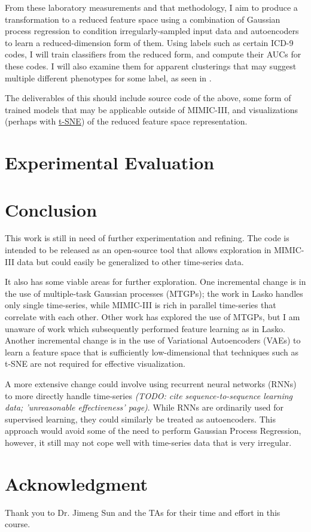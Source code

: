 \documentclass[journal]{IEEEtran}
\begin{document}
From these laboratory measurements and that methodology, I aim to
produce a transformation to a reduced feature space using a
combination of Gaussian process regression to condition
irregularly-sampled input data and autoencoders to learn a
reduced-dimension form of them.  Using labels such as certain ICD-9
codes, I will train classifiers from the reduced form, and compute
their AUCs for these codes.  I will also examine them for apparent
clusterings that may suggest multiple different phenotypes for some
label, as seen in \cite[figure 5]{Lasko2013}.

The deliverables of this should include source code of the above, some
form of trained models that may be applicable outside of MIMIC-III,
and visualizations (perhaps with
\href{https://lvdmaaten.github.io/tsne/}{t-SNE}) of the reduced
feature space representation.

\section{Experimental Evaluation}


\section{Conclusion}

This work is still in need of further experimentation and refining.
The code is intended to be released as an open-source tool that allows
exploration in MIMIC-III data but could easily be generalized to other
time-series data.

It also has some viable areas for further exploration.  One
incremental change is in the use of multiple-task Gaussian processes
(MTGPs); the work in Lasko handles only single time-series, while
MIMIC-III is rich in parallel time-series that correlate with each
other.  Other work has explored the use of MTGPs, but I am unaware of
work which subsequently performed feature learning as in Lasko.
Another incremental change is in the use of Variational Autoencoders
(VAEs) to learn a feature space that is sufficiently low-dimensional
that techniques such as t-SNE are not required for effective
visualization.

A more extensive change could involve using recurrent neural networks
(RNNs) to more directly handle time-series \emph{(TODO: cite
  sequence-to-sequence learning data; 'unreasonable effectiveness'
  page)}.  While RNNs are ordinarily used for supervised learning,
they could similarly be treated as autoencoders.  This approach would
avoid some of the need to perform Gaussian Process Regression,
however, it still may not cope well with time-series data that is very
irregular.

\section*{Acknowledgment}
Thank you to Dr. Jimeng Sun and the TAs for their time and effort in
this course.




\end{document}
